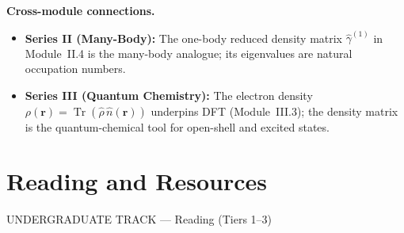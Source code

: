 \documentclass[11pt,a4paper]{article}
\begin{document}
\medskip
\begin{tcolorbox}[goldbox]
\textbf{Cross-module connections.}
\begin{itemize}[leftmargin=1.5em,itemsep=3pt]
  \item \textbf{Series II (Many-Body):}
    The one-body reduced density matrix $\hat{\gamma}^{(1)}$ in Module~II.4
    is the many-body analogue; its eigenvalues are natural occupation numbers.
  \item \textbf{Series III (Quantum Chemistry):}
    The electron density $\rho(\mathbf{r})=\operatorname{Tr}(\hat{\rho}\,\hat{n}(\mathbf{r}))$
    underpins DFT (Module~III.3); the density matrix is the quantum-chemical
    tool for open-shell and excited states.
\end{itemize}
\end{tcolorbox}

\newpage
\section{Reading and Resources}
\label{sec:L01.5}

\begin{tcolorbox}[trackheaderUG]
UNDERGRADUATE TRACK --- Reading (Tiers 1--3)
\end{tcolorbox}
\end{document}

